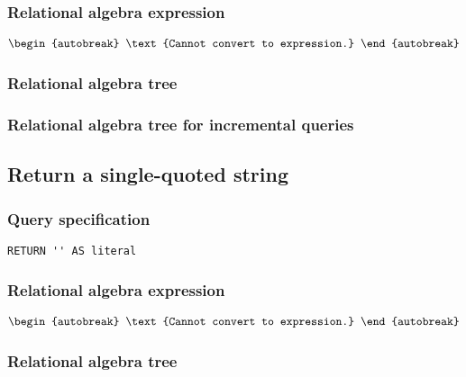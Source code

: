 \subsubsection*{Relational algebra expression}

\begin{align*}
\begin{autobreak}
\text{Cannot convert to expression.}
\end{autobreak}
\end{align*}

\subsubsection*{Relational algebra tree}


\subsubsection*{Relational algebra tree for incremental queries}


\subsection{Return a single-quoted string}

\subsubsection*{Query specification}

\begin{lstlisting}
RETURN '' AS literal
\end{lstlisting}

\subsubsection*{Relational algebra expression}

\begin{align*}
\begin{autobreak}
\text{Cannot convert to expression.}
\end{autobreak}
\end{align*}

\subsubsection*{Relational algebra tree}

